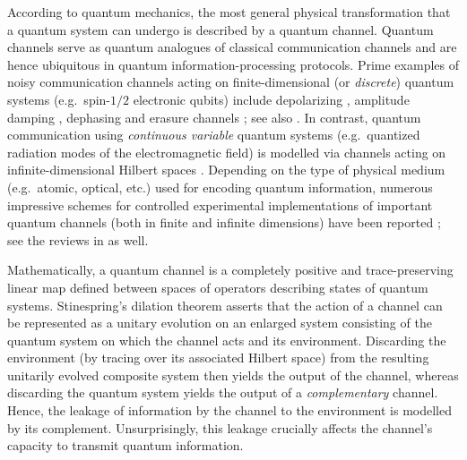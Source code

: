 \documentclass[a4paper,onecolumn,10pt,accepted=2022-07-11]{quantumarticle}
\theoremstyle{definition}
\begin{document}
According to quantum mechanics, the most general physical transformation that a quantum system can undergo is described by a quantum channel. Quantum channels serve as quantum analogues of classical communication channels and are hence ubiquitous in quantum information-processing protocols. Prime examples of noisy communication channels acting on finite-dimensional (or \emph{discrete}) quantum systems (e.g.~spin-$1/2$ electronic qubits) include depolarizing \cite{Bennett1996depol, Bennett1996entcap, King2003depol}, amplitude damping \cite{Giovannetti2005amp}, dephasing \cite{King2007complement} and erasure channels \cite{Pellizzari1997erasure, Bennett1997erasure}; see also \cite{Wilde2009book, Chuang2011book}. In contrast, quantum communication using \emph{continuous variable} quantum systems (e.g.~quantized radiation modes of the electromagnetic field) is modelled via channels acting on infinite-dimensional Hilbert spaces \cite{Holevo2012book, review-continuous, review-gaussian}. Depending on the type of physical medium (e.g.~atomic, optical, etc.) used for encoding quantum information, numerous impressive schemes for controlled experimental implementations of important quantum channels (both in finite and infinite dimensions) have been reported \cite{ex-amp1,ex-depol1,ex-depol2,ex-depol3,optics1,optics2,optics3,freespace1,freespace2,freespace3}; see the reviews in \cite{review-atomic,review-photonics} as well.

Mathematically, a quantum channel is a completely positive and trace-preserving linear map defined between spaces of operators describing states of quantum systems. Stinespring's dilation theorem \cite{Stinespring1955} asserts that the action of a channel can be represented as a unitary evolution on an enlarged system consisting of the quantum system on which the channel acts and its environment. Discarding the environment (by tracing over its associated Hilbert space) from the resulting unitarily evolved composite system then yields the output of the channel, whereas discarding the quantum system yields the output of a \emph{complementary} channel. Hence, the leakage of information by the 
channel to the environment is modelled by its complement. Unsurprisingly, this leakage crucially affects the channel's capacity to transmit quantum information.
\end{document}
